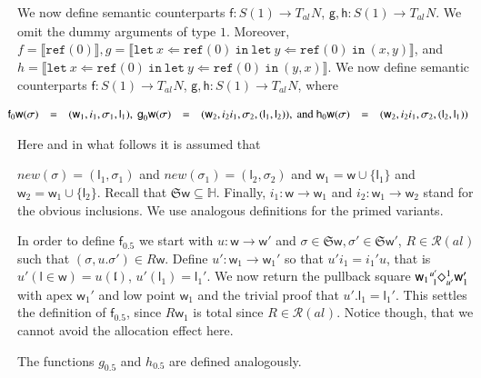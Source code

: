 \documentclass[orivec]{llncs}
\newif\iffull\fullfalse
\newcommand{\keywd}[1]{\mathtt{#1}}
\newcommand{\myref}[1]{\keywd{ref}(#1)}
\newcommand{\sq}[4]{\tensor*[^{#1}_{#2}]{\Diamond}{^{#3}_{#4}}}
\newcommand{\letin}[2]{\keywd{let}\:{#1}\!\Leftarrow\!{#2}\:\keywd{in}\:}
\newcommand{\Stores}{\ensuremath{\mathbb{H}}}
\newcommand{\sem}[1]{\ensuremath{\llbracket {#1} \rrbracket}}
\newcommand{\aEff}[1]{\ensuremath{\mathit{al}_{#1}}}
\newcommand{\loc}{\mathfrak{l}}
\newcommand{\cloc}{\ensuremath{\mathsf{l}}\xspace}
\newcommand\w{\ensuremath{\mathsf{w}}\xspace}
\newcommand{\Astores}{\mathfrak{S}}
\newcommand\Rscr{\ensuremath{\mathcal{R}}\xspace}
\begin{document}
\noindent
We now define semantic counterparts $\textsf{f}:S(1)\rightarrow
T_{\aEff{}}N$, 
$\textsf{g}, \textsf{h}:S(1)\rightarrow T_{\aEff{}}N$. We omit the dummy
arguments of type $1$.
\else
Moreover, 
$f =\sem{\myref{0}}, 
g = \sem{\letin{x}{\myref{0}}{\letin{y}{\myref{0}}{
(x,y)}}}$, and $ 
h = \sem{\letin{x}{\myref{0}}{\letin{y}{\myref{0}}{
(y,x)}}}$.
We now define semantic counterparts $\textsf{f}:S(1)\rightarrow
T_{\aEff{}}N$, 
$\textsf{g}, \textsf{h}:S(1)\rightarrow T_{\aEff{}}N$, where
\fi
\iffull
\[
 \begin{array}{lcl}
\textsf{f}_0\w(\sigma) & = & (\w_1,i_1,\sigma_1,\cloc_1), \\
\textsf{g}_0\w(\sigma) & = & (\w_2,i_2i_1,\sigma_2,(\cloc_1,\cloc_2))\\
\textsf{h}_0\w(\sigma) & = & (\w_2,i_2i_1,\sigma_2,(\cloc_2,\cloc_1))  
 \end{array}
\]
Here and in what follows it is assumed that
\else

\(
\hspace{-5mm}
 \begin{array}{lcllcllcl}
\textsf{f}_0\w(\sigma) & = & (\w_1,i_1,\sigma_1,\cloc_1),~ 
\textsf{g}_0\w(\sigma) & = & (\w_2,i_2i_1,\sigma_2,(\cloc_1,\cloc_2)),
\textrm{ and }
\textsf{h}_0\w(\sigma) & = & (\w_2,i_2i_1,\sigma_2,(\cloc_2,\cloc_1))  
 \end{array}
\)

\noindent
Here and in what follows it is assumed that
\fi
$\textit{new}(\sigma)=(\cloc_1,\sigma_1)$ and
$\textit{new}(\sigma_1)=(\cloc_2,\sigma_2)$ and
$\w_1=\w\cup\{\cloc_1\}$ and $\w_2=\w_1\cup\{\cloc_2\}$. Recall that
$\Astores\w\subseteq\Stores$. Finally, $i_1:\w\rightarrow\w_1$ and
$i_2:\w_1\rightarrow\w_2$ stand for the obvious inclusions.  We use
analogous definitions for the primed variants.

In order to define $\textsf{f}_{0.5}$ we start with
$u:\w\rightarrow\w'$ and $\sigma\in\Astores\w,\sigma'\in\Astores\w'$,
$R\in\Rscr(\aEff{})$ such that $(\sigma,u.\sigma')\in R\w$. Define
$u':\w_1\rightarrow\w_1'$ so that $u'i_1=i_1'u$, that is
$u'(\cloc\in\w)=u(\loc)$, $u'(\cloc_1)=\cloc_1'$. We now return the
pullback square $\w_1\sq{u'}{1}{1}{u'}\w_1'$ with apex $\w_1'$ and low
point $\w_1$ and the trivial proof that $u'.\cloc_1=\cloc_1'$. This 
settles the definition of $\textsf{f}_{0.5}$, since $R\w_1$ is total since
$R\in\Rscr(\aEff{})$. Notice though, that we cannot avoid the allocation
effect here.

The functions $g_{0.5}$ and $h_{0.5}$ are defined analogously.
\end{document}
